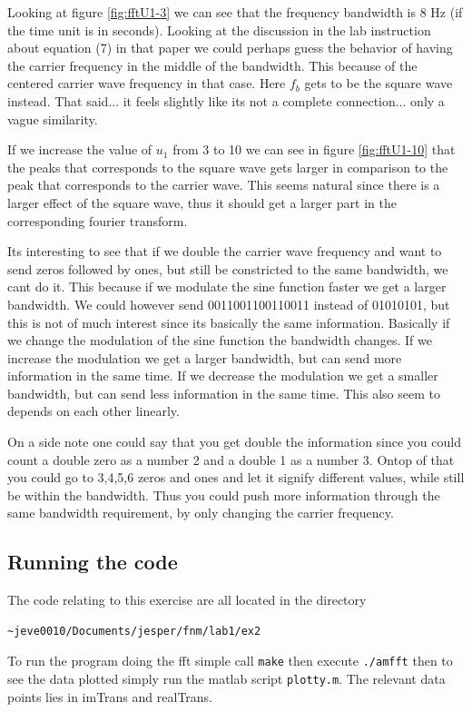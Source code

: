 \documentclass[11pt]{article}
\begin{document}
Looking at figure \ref{fig:fftU1-3} we can see that the frequency bandwidth is 8 Hz (if the time unit is in seconds). Looking at the discussion in the lab instruction about equation (7) in that paper we could perhaps guess the behavior of having  the carrier frequency in the middle of the bandwidth. This because of the centered carrier wave frequency in that case. Here $f_b$ gets to be the square wave instead. That said... it feels slightly like its not a complete connection... only a vague similarity. 

If we increase the value of $u_1$ from 3 to 10 we can see in figure \ref{fig:fftU1-10} that the peaks that corresponds to the square wave gets larger in comparison to the peak that corresponds to the carrier wave. This seems natural since there is a larger effect of the square wave, thus it should get a larger part in the corresponding fourier transform. 

Its interesting to see that if we double the carrier wave frequency and want to send zeros followed by ones, but still be constricted to the same bandwidth, we cant do it. This because if we modulate the sine function faster we get a larger bandwidth. We could however send 0011001100110011 instead of 01010101, but this is not of much interest since its basically the same information. Basically if we change the modulation of the sine function the bandwidth changes. If we increase the modulation we get a larger bandwidth, but can send more information in the same time. If we decrease the modulation we get a smaller bandwidth, but can send less information in the same time. This also seem to depends on each other linearly. 

On a side note one could say that you get double the information since you could count a double zero as a number 2 and a double 1 as a number 3. Ontop of that you could go to 3,4,5,6 zeros and ones and let it signify different values, while still be within the bandwidth. Thus you could push more information through the same bandwidth requirement, by only changing the carrier frequency. 

\subsection{Running the code}
The code relating to this exercise are all located in the directory
\begin{verbatim}
~jeve0010/Documents/jesper/fnm/lab1/ex2
\end{verbatim}
To run the program doing the fft simple call \verb+make+ then execute \verb+./amfft+ then to see the data plotted simply run the matlab script \verb+plotty.m+.  The relevant data points lies in imTrans and realTrans.
\newpage
\end{document}
